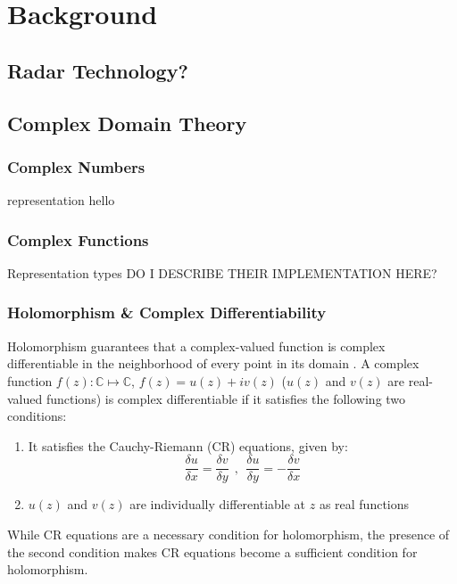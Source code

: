 \chapter{Background}\label{chap:comp}
\section{Radar Technology?}
\section{Complex Domain Theory}
\subsection{Complex Numbers}
representation
hello
\subsection{Complex Functions}




Representation types
DO I DESCRIBE THEIR IMPLEMENTATION HERE?

\subsection{Holomorphism \& Complex Differentiability}

Holomorphism guarantees that a complex-valued function is complex differentiable in the neighborhood of every point in its domain \cite{trabelsi2018deep}.
A complex function $f(z): \mathbb{C} \mapsto \mathbb{C}$, $f(z)= u(z) + iv(z)$ ($u(z)$ and $v(z)$ are real-valued functions) is complex differentiable if it satisfies the following two conditions:
\begin{enumerate}

	\item It satisfies the Cauchy-Riemann (CR) equations, given by:
\begin{equation}\label{eq:compdiff}
\frac{\delta u}{\delta x} = \frac{\delta v}{\delta y} ~~,~~ \frac{\delta u}{\delta y} = - \frac{\delta v}{\delta x} 
\end{equation}
	\item $u(z)$ and $v(z)$ are individually differentiable at $z$ as real functions	
\end{enumerate} 

While CR equations are a necessary condition for holomorphism, the presence of the second condition makes CR equations become a sufficient condition for holomorphism.  